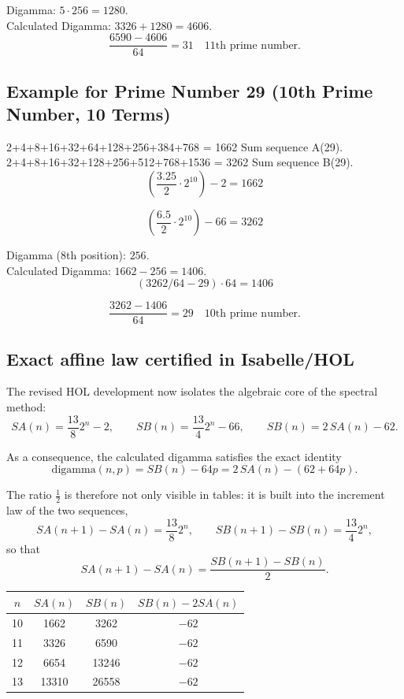 \documentclass[a4paper,11pt]{article}
\begin{document}
Digamma: \(5 \cdot 256 = 1280\).\\
Calculated Digamma: \(3326 + 1280 = 4606\).\\

\[
\frac{6590 - 4606}{64} = 31 \quad \text{11th prime number.}
\]

\bigskip

\subsection*{Example for Prime Number 29 (10th Prime Number, 10 Terms)}

2+4+8+16+32+64+128+256+384+768 = 1662 Sum sequence A(29).\\
2+4+8+16+32+128+256+512+768+1536 = 3262 Sum sequence B(29).\\

\[
\left(\frac{3.25}{2} \cdot 2^{10}\right) - 2 = 1662
\]

\[
\left(\frac{6.5}{2} \cdot 2^{10}\right) - 66 = 3262
\]

Digamma (8th position): \(256\).\\
Calculated Digamma: \(1662 - 256 = 1406\).\\

\[
(3262/64 - 29) \cdot 64 = 1406
\]

\[
\frac{3262 - 1406}{64} = 29 \quad \text{10th prime number.}
\]

\bigskip

\subsection*{Exact affine law certified in Isabelle/HOL}

The revised HOL development now isolates the algebraic core of the spectral method:
\[
SA(n)=\frac{13}{8}2^n-2,
\qquad
SB(n)=\frac{13}{4}2^n-66,
\qquad
SB(n)=2\,SA(n)-62.
\]

As a consequence, the calculated digamma satisfies the exact identity
\[
\mathrm{digamma}(n,p)=SB(n)-64p=2\,SA(n)-(62+64p).
\]

The ratio $\tfrac12$ is therefore not only visible in tables: it is built into the
increment law of the two sequences,
\[
SA(n+1)-SA(n)=\frac{13}{8}2^n,
\qquad
SB(n+1)-SB(n)=\frac{13}{4}2^n,
\]
so that
\[
SA(n+1)-SA(n)=\frac{SB(n+1)-SB(n)}{2}.
\]

\begin{center}
\begin{tabular}{cccc}
\toprule
$n$ & $SA(n)$ & $SB(n)$ & $SB(n)-2SA(n)$ \\
\midrule
10 & 1662 & 3262 & $-62$ \\
11 & 3326 & 6590 & $-62$ \\
12 & 6654 & 13246 & $-62$ \\
13 & 13310 & 26558 & $-62$ \\
\bottomrule
\end{tabular}
\end{center}
\end{document}
